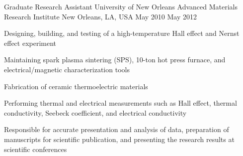 \begin{cventries}
\cventry%
{Graduate Research Assistant} %
{University of New Orleans \textendash{} Advanced Materials Research Institute} %
{New Orleans, LA, USA} %
{May 2010 \textendash{} May 2012} %
{
  \begin{cvitems} %
    \item {Designing, building, and testing of a high-temperature Hall effect and Nernst effect experiment}
    \item {Maintaining spark plasma sintering (SPS), 10-ton hot press furnace, and electrical/magnetic characterization tools}
    \item {Fabrication of ceramic thermoelectric materials}
    \item {Performing thermal and electrical measurements such as Hall effect, thermal conductivity, Seebeck coefficient, and electrical conductivity}
    \item {Responsible for accurate presentation and analysis of data, preparation of manuscripts for scientific publication, and presenting the research results at scientific conferences}
  \end{cvitems}
}

\end{cventries}